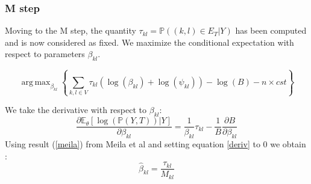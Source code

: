 \documentclass[a4paper,11pt]{article}
\DeclareMathOperator*{\argmax}{arg\,max}
\begin{document}
  \subsubsection{M step}
   Moving to the M step, the quantity $\tau_{kl} =  \mathds{P}((k,l) \in E_T|Y)$ has been computed and is now considered as fixed.
We maximize the conditional expectation with respect to parameters $\beta_{kl}$.


 \[\argmax_{\beta_{kl}} \left\{\sum_{k,l\in V} \tau_{kl}(\log(\beta_{kl}) + \log(\psi_{kl}) ) -\log(B) - n\times cst\right\}\]

 We take the derivative with respect to $\beta_{kl}$:
\begin{equation}
 \label{deriv}
 \frac{\partial\mathds{E}_\theta[\log(\mathds{P}(Y,T))|Y]}{\partial\beta_{kl}} =\frac{1 }{\beta_{kl}} \tau_{kl} - \frac{1}{B}
\frac{\partial B}{\partial\beta_{kl}}
\end{equation}
Using result (\ref{meila}) from Meila et al and setting equation \ref{deriv} to 0 we obtain :
\[\boxed{\hat{\beta}_{kl} = \frac{\tau_{kl}}{M_{kl}}}\]
 


\end{document}
